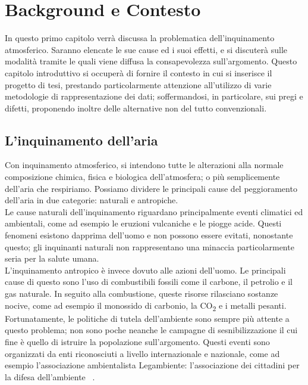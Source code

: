 \clearpage{\pagestyle{empty}\cleardoublepage}
\chapter{Background e Contesto}                %
\lhead[\fancyplain{}{\bfseries\thepage}]{\fancyplain{}{\bfseries\rightmark}}

In questo primo capitolo verrà discussa la problematica dell'inquinamento atmosferico.
Saranno elencate le sue cause ed i suoi effetti, e si discuterà sulle modalità tramite le quali viene diffusa la consapevolezza sull'argomento.
Questo capitolo introduttivo si occuperà di fornire il contesto in cui si inserisce il progetto di tesi, prestando particolarmente attenzione all'utilizzo di varie metodologie di rappresentazione dei dati; soffermandosi, in particolare, sui pregi e difetti, proponendo inoltre delle alternative non del tutto convenzionali.

\section{L'inquinamento dell'aria}
Con inquinamento atmosferico, si intendono tutte le alterazioni alla normale composizione chimica, fisica e biologica dell’atmosfera; o più semplicemente dell’aria che respiriamo.
Possiamo dividere le principali cause del peggioramento dell’aria in due categorie: naturali e antropiche.
\\
Le cause naturali dell'inquinamento riguardano principalmente eventi climatici ed ambientali, come ad esempio le eruzioni vulcaniche e le piogge acide.
Questi fenomeni esistono dapprima dell'uomo e non possono essere evitati, nonostante questo; gli inquinanti naturali non rappresentano una minaccia particolarmente seria per la salute umana.
\\
L'inquinamento antropico è invece dovuto alle azioni dell'uomo. Le principali cause di questo sono l’uso di combustibili fossili come il carbone, il petrolio e il gas naturale.
In seguito alla combustione, queste risorse rilasciano sostanze nocive, come ad esempio il monossido di carbonio, la CO\textsubscript{2} e i metalli pesanti.
Fortunatamente, le politiche di tutela dell'ambiente sono sempre più attente a questo problema;
non sono poche neanche le campagne di sesnibilizzazione il cui fine è quello di istruire la popolazione sull'argomento. Questi eventi sono organizzati da enti riconosciuti a livello internazionale e nazionale, come ad esempio l'associazione ambientalista Legambiente: l'associazione dei cittadini per la difesa dell'ambiente ~\cite{la_mincrometrologia}.
\\
